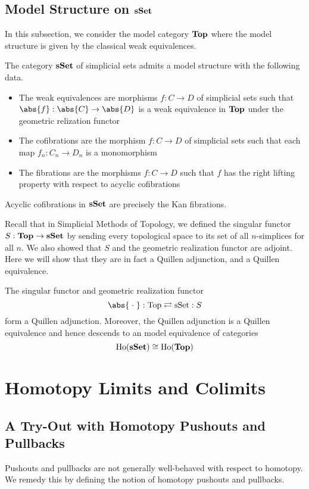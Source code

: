 \documentclass[a4paper]{article}
\begin{document}
\subsection{Model Structure on $\bold{sSet}$}
In this subsection, we consider the model category $\bold{Top}$ where the model structure is given by the classical weak equivalences. 

\begin{thm}{}{} The category $\bold{sSet}$ of simplicial sets admits a model structure with the following data. 
\begin{itemize}
\item The weak equivalences are morphisms $f:C\to D$ of simplicial sets such that $\abs{f}:\abs{C}\to\abs{D}$ is a weak equivalence in $\bold{Top}$ under the geometric relization functor
\item The cofibrations are the morphism $f:C\to D$ of simplicial sets such that each map $f_n:C_n\to D_n$ is a monomorphism
\item The fibrations are the morphisms $f:C\to D$ such that $f$ has the right lifting property with respect to acyclic cofibrations
\end{itemize}
\end{thm}

\begin{lmm}{}{} Acyclic cofibrations in $\bold{sSet}$ are precisely the Kan fibrations. 
\end{lmm}

Recall that in Simplicial Methods of Topology, we defined the singular functor $S:\bold{Top}\to\bold{sSet}$ by sending every topological space to its set of all $n$-simplices for all $n$. We also showed that $S$ and the geometric realization functor are adjoint. Here we will show that they are in fact a Quillen adjunction, and a Quillen equivalence. 

\begin{thm}{}{} The singular functor and geometric realization functor $$\abs{\;\cdot\;}:\text{Top}\rightleftarrows\text{sSet}:S$$ form a Quillen adjunction. Moreover, the Quillen adjunction is a Quillen equivalence and hence descends to an model equivalence of categories $$\text{Ho}(\bold{sSet})\cong\text{Ho}(\bold{Top})$$
\end{thm}

\pagebreak
\section{Homotopy Limits and Colimits}
\subsection{A Try-Out with Homotopy Pushouts and Pullbacks}
Pushouts and pullbacks are not generally well-behaved with respect to homotopy. We remedy this by defining the notion of homotopy pushouts and pullbacks. 
\end{document}
